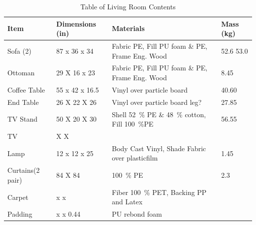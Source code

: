 \documentclass[12pt,oneside]{book}
\begin{document}
\begin{table}[!ht]
	\centering
	\caption{Table of Living Room Contents}
	\label{tab:BRFuel}
	\begin{tabular}{llll}
		\toprule[1.5pt]
		Item 				& Dimensions (in) 	& Materials 										& Mass (kg)  \\
		\midrule
		Sofa (2) 		  	& 87 x 36 x 34  	& Fabric PE, Fill PU foam \& PE, Frame Eng. Wood	& 52.6 53.0      \\
		Ottoman     		& 29 X 16 x 23 		& Fabric PE, Fill PU foam \& PE, Frame Eng. Wood   	& 8.45       \\
		Coffee Table   		& 55 x 42 x 16.5	& Vinyl over particle board  						& 40.60     \\
		End Table      		& 26 X 22 X 26 		& Vinyl over particle board  leg? 					& 27.85     \\	
		TV Stand	 		& 50 X 20 X 30 		& Shell 52~\% PE \& 48~\% cotton, Fill 100~\%PE 	& 56.55   \\	
		TV 					&    X    X 		& 										  			&         \\
		Lamp 				& 12 x 12 x 25		& Body Cast Vinyl, Shade Fabric over plasticfilm	& 1.45  \\
		Curtains(2 pair) 	& 84 X 84 			& 100~\% PE 										& 2.3   \\
		Carpet				&  x  x 			& Fiber 100~\% PET, Backing PP and Latex			&  \\
		Padding				&  x  x 0.44		& PU rebond foam									& 	\\
		\bottomrule[1.25pt]
	\end{tabular}
\end{table}
\end{document}
